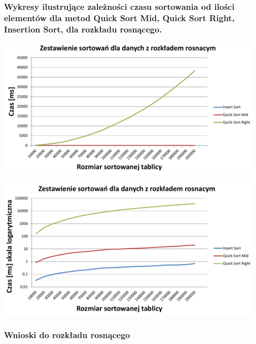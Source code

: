 \documentclass[polish,polish,a4paper]{article}
\begin{document}
\begin{spacing}{1.5}
\subsubsection*{Wykresy ilustrujące zależności czasu sortowania od ilości elementów dla metod Quick Sort Mid, Quick Sort Right, Insertion Sort, dla rozkładu rosnącego.}
	

\begin{minipage}[H]{\textwidth}
	\begin{center}
		\includegraphics[scale=0.6]{zad3rosnacynorm.pdf}
		\label{fig:zad3rosn}
	\end{center}
\end{minipage}

\begin{minipage}[H]{\textwidth}
	\begin{center}
		\includegraphics[scale=0.6]{zad3rosnacylog.pdf}
		\label{fig:zad3roslog}
	\end{center}
\end{minipage}


\subsubsection{Wnioski do rozkładu rosnącego}


\end{spacing}
\end{document}
